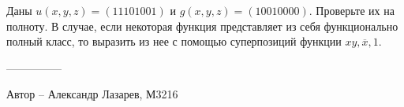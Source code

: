 \question
Даны $u(x, y, z) = (11101001)$ и $g(x, y, z) = (10010000)$. Проверьте их на полноту. В случае, если некоторая функция представляет из себя функционально полный класс, то выразить из нее с помощью суперпозиций функции $xy, \overline{x}, 1$.

---------------

Автор -- Александр Лазарев, М3216